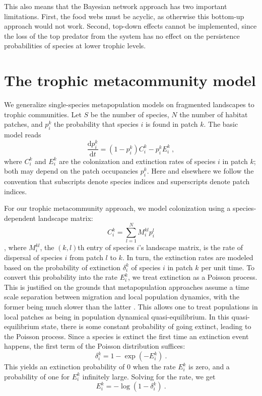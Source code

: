 \documentclass[11pt]{article}
\newcommand{\ud}{\text{d}}
\begin{document}
This also means that the Bayesian network approach has two important limitations. First, the food webs must be acyclic, as otherwise this bottom-up approach would not work. Second, top-down effects cannot be implemented, since the loss of the top predator from the system has no effect on the persistence probabilities of species at lower trophic levels.


\section{The trophic metacommunity model} \label{sec:tmm}

We generalize single-species metapopulation models on fragmented landscapes \citep{HanskiOvaskainen2000, OvaskainenHanski2001, HanskiOvaskainen2003, Grillietal2015} to trophic communities. Let $S$ be the number of species, $N$ the number of habitat patches, and $p_i^k$ the probability that species $i$ is found in patch $k$. The basic model reads
\begin{equation}
  \label{eq:model}
  \frac{\ud p_i^k}{\ud t} = (1 - p_i^k) C_i^k - p_i^k E_i^k \ ,
\end{equation}
where $C_i^k$ and $E_i^k$ are the colonization and extinction rates of species $i$ in patch $k$; both may depend on the patch occupancies $p_i^k$. Here and elsewhere we follow the convention that subscripts denote species indices and superscripts denote patch indices.

For our trophic metacommunity approach, we model colonization using a species-dependent landscape matrix:
\begin{equation}
  \label{eq:colonization}
  C_i^k = \sum_{l=1}^N M_i^{kl} p_i^l
\end{equation}
\citep{OvaskainenHanski2001}, where $M_i^{kl}$, the $(k,l)$th entry of species $i$'s landscape matrix, is the rate of dispersal of species $i$ from patch $l$ to $k$. In turn, the extinction rates are modeled based on the probability of extinction $\delta_i^k$ of species $i$ in patch $k$ per unit time. To convert this probability into the rate $E_i^k$, we treat extinction as a Poisson process. This is justified on the grounds that metapopulation approaches assume a time scale separation between migration and local population dynamics, with the former being much slower than the latter \citep{Hanski1994}. This allows one to treat populations in local patches as being in population dynamical quasi-equilibrium. In this quasi-equilibrium state, there is some constant probability of going extinct, leading to the Poisson process. Since a species is extinct the first time an extinction event happens, the first term of the Poisson distribution suffices:
\begin{equation}
  \label{eq:probrate}
  \delta_i^k = 1 - \exp(-E_i^k) \ .
\end{equation}
This yields an extinction probability of $0$ when the rate $E_i^k$ is zero, and a probability of one for $E_i^k$ infinitely large. Solving for the rate, we get
\begin{equation}
  \label{eq:extinction}
  E_i^k = -\log(1 - \delta_i^k) \ .
\end{equation}
\end{document}
